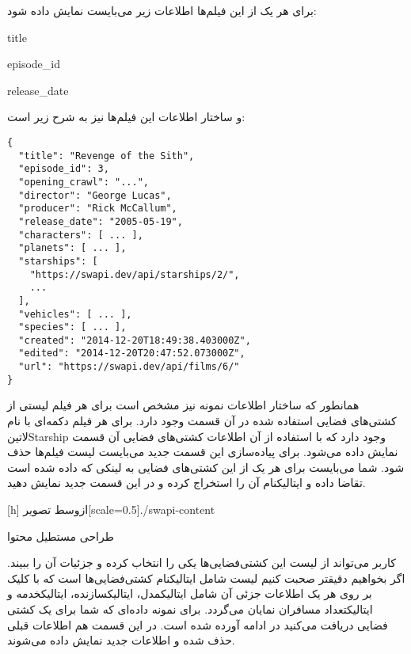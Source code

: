 \documentclass[../main.tex]{subfiles}
\begin{document}
برای هر یک از این فیلم‌ها اطلاعات زیر می‌بایست نمایش داده شود:

\begin{itemize}\begin{latinitems}
  \item title
  \item episode\_id
  \item release\_date
\end{latinitems}\end{itemize}

و ساختار اطلاعات این فیلم‌ها نیز به شرح زیر است:

\begin{latin}
\begin{verbatim}
{
  "title": "Revenge of the Sith",
  "episode_id": 3,
  "opening_crawl": "...",
  "director": "George Lucas",
  "producer": "Rick McCallum",
  "release_date": "2005-05-19",
  "characters": [ ... ],
  "planets": [ ... ],
  "starships": [
    "https://swapi.dev/api/starships/2/",
    ...
  ],
  "vehicles": [ ... ],
  "species": [ ... ],
  "created": "2014-12-20T18:49:38.403000Z",
  "edited": "2014-12-20T20:47:52.073000Z",
  "url": "https://swapi.dev/api/films/6/"
}
\end{verbatim}
\end{latin}

همانطور که ساختار اطلاعات نمونه نیز مشخص است برای هر فیلم لیستی از کشتی‌های فضایی استفاده شده در آن قسمت وجود دارد.
برای هر فیلم دکمه‌ای با نام ‌لاتین{Starship} وجود دارد که با استفاده از آن اطلاعات کشتی‌های فضایی آن قسمت نمایش داده می‌شود.
برای پیاده‌سازی این قسمت جدید می‌بایست لیست فیلم‌ها حذف شود.
شما می‌بایست برای هر یک از این کشتی‌های فضایی به لینکی که داده شده است تقاضا داده و ‌ایتالیک{نام} آن را استخراج کرده
و در این قسمت جدید نمایش دهید.

[h]
  ‌ازوسط
  ‌تصویر[scale=0.5]{./swapi-content}
  \caption{طراحی مستطیل محتوا}

کاربر می‌تواند از لیست این کشتی‌فضایی‌ها یکی را انتخاب کرده و جزئیات آن را ببیند.
اگر بخواهیم دقیقتر صحبت کنیم لیست شامل ‌ایتالیک{نام} کشتی‌فضایی‌ها است
که با کلیک بر روی هر یک اطلاعات جزئی آن شامل ‌ایتالیک{مدل}، ‌ایتالیک{سازنده}، ‌ایتالیک{خدمه} و ‌ایتالیک{تعداد مسافران} نمایان می‌گردد.
برای نمونه داده‌ای که شما برای یک کشتی فضایی دریافت می‌کنید در ادامه آورده شده است.
در این قسمت هم اطلاعات قبلی حذف شده و اطلاعات جدید نمایش داده می‌شوند.
\end{document}
